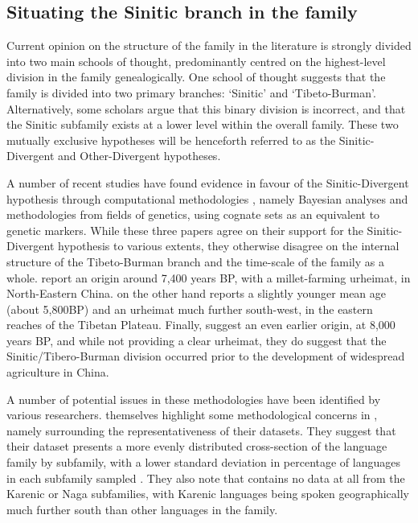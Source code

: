\subsection{Situating the Sinitic branch in the family}\label{ss:THOverview:HighLevelStructure}

Current opinion on the structure of the family in the literature is strongly divided into two main schools of thought, predominantly centred on the highest-level division in the family genealogically. One school of thought suggests that the family is divided into two primary branches: `Sinitic' and `Tibeto-Burman'. Alternatively, some scholars argue that this binary division is incorrect, and that the Sinitic subfamily exists at a lower level within the overall family. These two mutually exclusive hypotheses will be henceforth referred to as the Sinitic-Divergent and Other-Divergent hypotheses.

A number of recent studies have found evidence in favour of the Sinitic-Divergent hypothesis through computational methodologies \cites{ZhangM2019Baye}{ZhangH2020Baye}{Sagart2019Baye}, namely Bayesian analyses and methodologies from fields of genetics, using cognate sets as an equivalent to genetic markers. While these three papers agree on their support for the Sinitic-Divergent hypothesis to various extents, they otherwise disagree on the internal structure of the Tibeto-Burman branch and the time-scale of the family as a whole.  report an origin around 7,400 years BP, with a millet-farming urheimat, in North-Eastern China.  on the other hand reports a slightly younger mean age (about 5,800BP) and an urheimat much further south-west, in the eastern reaches of the Tibetan Plateau. Finally,  suggest an even earlier origin, at 8,000 years BP, and while not providing a clear urheimat, they do suggest that the Sinitic/Tibero-Burman division occurred prior to the development of widespread agriculture in China.

A number of potential issues in these methodologies have been identified by various researchers.  themselves highlight some methodological concerns in , namely surrounding the representativeness of their datasets. They suggest that their dataset presents a more evenly distributed cross-section of the language family by subfamily, with a lower standard deviation in percentage of languages in each subfamily sampled \cite{ZhangH2020Baye}. They also note that  contains no data at all from the Karenic or Naga subfamilies, with Karenic languages being spoken geographically much further south than other languages in the family.

